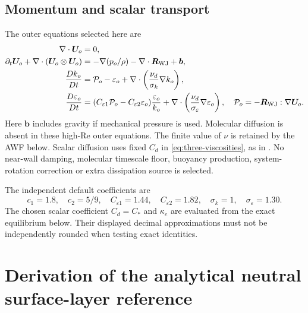 \documentclass[11pt,a4paper]{article}
\numberwithin{equation}{section}
\newcommand{\eps}{\varepsilon}
\begin{document}
\subsection{Momentum and scalar transport}
The outer equations selected here are
\begin{align}
 \nabla\cdot\bm U_o&=0,\nonumber\\
 \partial_t\bm U_o+\nabla\cdot(\bm U_o\otimes\bm U_o)
 &=-\nabla(p_o/\rho)-\nabla\cdot\bm R_{\rm WJ}+\bm b,\label{eq:outer-momentum}\\
 \frac{Dk_o}{Dt}
 &=\mathcal P_o-\eps_o+
 \nabla\cdot\left(\frac{\nu_d}{\sigma_k}\nabla k_o\right),\label{eq:outer-k}\\
 \frac{D\eps_o}{Dt}
 &=(C_{\eps1}\mathcal P_o-C_{\eps2}\eps_o)\frac{\eps_o}{k_o}
 +\nabla\cdot\left(\frac{\nu_d}{\sigma_\eps}\nabla\eps_o\right),
 \quad \mathcal P_o=-\bm R_{\rm WJ}:\nabla\bm U_o.
 \label{eq:outer-epsilon}
\end{align}
Here $\bm b$ includes gravity if mechanical pressure is used.
Molecular diffusion is absent in these high-Re outer equations.
The finite value of $\nu$ is retained by the AWF below.
Scalar diffusion uses fixed $C_d$ in \eqref{eq:three-viscosities},
as in \cite[Section 2.4]{Baungaard2022}.
No near-wall damping, molecular timescale floor, buoyancy production,
system-rotation correction or extra dissipation source is selected.

The independent default coefficients are
\begin{equation}
 c_1=1.8,\quad c_2=5/9,\quad
 C_{\eps1}=1.44,\quad C_{\eps2}=1.82,\quad
 \sigma_k=1,\quad \sigma_\eps=1.30.
 \label{eq:default-constants}
\end{equation}
The chosen scalar coefficient $C_d=C_*$ and $\kappa_e$ are evaluated
from the exact equilibrium below. Their displayed decimal approximations
must not be independently rounded when testing exact identities.

\section{Derivation of the analytical neutral surface-layer reference}
\label{sec:outer-reference}
\end{document}

